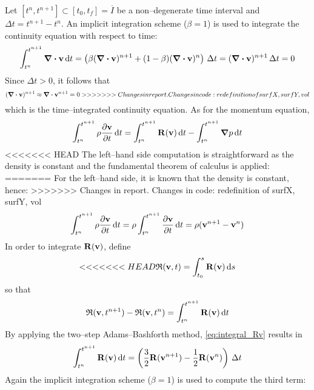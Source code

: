 Let $[t^n, t^{n+1}] \subset [t_0, t_f] = \overline{I}$ be a non--degenerate time interval and $\Delta t = t^{n+1} - t^n$. An implicit integration scheme ($\beta = 1$) is used to integrate the continuity equation with respect to time:
\begin{gather*}
    \int_{t^n}^{t^{n+1}} \div{\vb{v}} \dd{t} =
    \left( \beta (\div{\vb{v}})^{n+1} + (1 - \beta) (\div{\vb{v}})^{n} \right) \, \Delta t =
    (\div{\vb{v}})^{n+1} \, \Delta t = 0
\end{gather*}
Since $\Delta t > 0$, it follows that
\begin{equation} \label{eq:continuity_time_integrated}
    (\div{\vb{v}})^{n+1} \approx \div{\vb{v}^{n+1}} = 0
>>>>>>> Changes in report. Changes in code: redefinition of surfX, surfY, vol
\end{equation}
which is the time--integrated continuity equation. As for the momentum equation,
\begin{equation*}
    \int_{t^n}^{t^{n+1}} \rho \pdv{\vb{v}}{t} \dd{t} =
    \int_{t^n}^{t^{n+1}} \vb{R}(\vb{v}) \dd{t} -
    \int_{t^n}^{t^{n+1}} \grad{p} \dd{t}
\end{equation*}
<<<<<<< HEAD
The left--hand side computation is straightforward as the density is constant and the fundamental theorem of calculus is applied:
=======
For the left--hand side, it is known that the density is constant, hence:
>>>>>>> Changes in report. Changes in code: redefinition of surfX, surfY, vol
\begin{equation*}
    \int_{t^n}^{t^{n+1}} \rho \pdv{\vb{v}}{t} \dd{t} =
    \rho \int_{t^n}^{t^{n+1}} \pdv{\vb{v}}{t} \dd{t} =
    \rho ( \vb{v}^{n+1} - \vb{v}^n )
\end{equation*}
In order to integrate $\vb{R}(\vb{v})$, define
\begin{equation*}
<<<<<<< HEAD
    \mathfrak{R}(\vb{v},t) = \int_{t_0}^s \vb{R}(\vb{v}) \dd{s}
\end{equation*}
so that
\begin{equation} \label{eq:integral_Rv}
    \mathfrak{R}(\vb{v},t^{n+1}) - \mathfrak{R}(\vb{v},t^{n}) =
    \int_{t^n}^{t^{n+1}} \vb{R}(\vb{v}) \dd{t}
\end{equation}
By applying the two--step Adams--Bashforth method, \eqref{eq:integral_Rv} results in
\begin{equation*}
    \int_{t^n}^{t^{n+1}} \vb{R}(\vb{v}) \dd{t} =
    \left( \frac{3}{2} \vb{R}(\vb{v}^{n+1}) - \frac{1}{2} \vb{R}(\vb{v}^n) \right) \, \Delta t
\end{equation*}
Again the implicit integration scheme ($\beta = 1$) is used to compute the third term:
